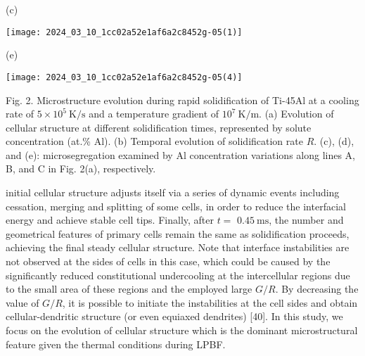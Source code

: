 \documentclass[10pt]{article}
\begin{document}
(c)

\begin{center}
\texttt{[image: 2024\_03\_10\_1cc02a52e1af6a2c8452g-05(1)]}
\end{center}

(e)

\begin{center}
\texttt{[image: 2024\_03\_10\_1cc02a52e1af6a2c8452g-05(4)]}
\end{center}

Fig. 2. Microstructure evolution during rapid solidification of Ti-45Al at a cooling rate of $5 \times 10^{5} \mathrm{~K} / \mathrm{s}$ and a temperature gradient of $10^{7} \mathrm{~K} / \mathrm{m}$. (a) Evolution of cellular structure at different solidification times, represented by solute concentration (at.\% Al). (b) Temporal evolution of solidification rate $R$. (c), (d), and (e): microsegregation examined by Al concentration variations along lines A, B, and C in Fig. 2(a), respectively.

initial cellular structure adjusts itself via a series of dynamic events including cessation, merging and splitting of some cells, in order to reduce the interfacial energy and achieve stable cell tips. Finally, after $t=$ $0.45 \mathrm{~ms}$, the number and geometrical features of primary cells remain the same as solidification proceeds, achieving the final steady cellular structure. Note that interface instabilities are not observed at the sides of cells in this case, which could be caused by the significantly reduced constitutional undercooling at the intercellular regions due to the small area of these regions and the employed large $G / R$. By decreasing the value of $G / R$, it is possible to initiate the instabilities at the cell sides and obtain cellular-dendritic structure (or even equiaxed dendrites) [40]. In this study, we focus on the evolution of cellular structure which is the dominant microstructural feature given the thermal conditions during LPBF.
\end{document}
